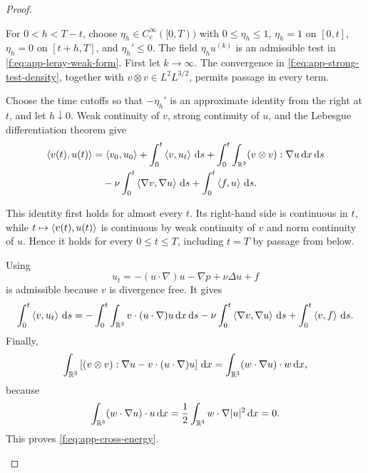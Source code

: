 \begin{proof}
\begin{samepage}
For \(0<h<T-t\), choose \(\eta_h\in C_c^\infty([0,T))\) with
\(0\le\eta_h\le1\), \(\eta_h=1\) on \([0,t]\),
\(\eta_h=0\) on \([t+h,T]\), and \(\eta_h'\le0\).  The field
\(\eta_hu^{(k)}\) is an admissible test in
\eqref{f:eq:app-leray-weak-form}.  First let \(k\to\infty\).
The convergence in \eqref{f:eq:app-strong-test-density}, together with
\(v\otimes v\in L^2L^{3/2}\), permits passage in every term.
\par
\end{samepage}
\begin{samepage}
Choose the time cutoffs so that \(-\eta_h'\) is an approximate identity from the right
at \(t\), and let \(h\downarrow0\).  Weak continuity of \(v\), strong
continuity of \(u\), and the Lebesgue differentiation theorem give
\begin{align*}
 \left\langle v(t),u(t)\right\rangle
 &=
 \left\langle v_0,u_0\right\rangle
 +\int_0^t\left\langle v,u_t\right\rangle\,\mathrm d s
 +\int_0^t\int_{\mathbb R^3}(v\otimes v):\nabla u\,\mathrm d x\,\mathrm d s\\
 &\quad-\nu\int_0^t\left\langle \nabla v,\nabla u\right\rangle\,\mathrm d s
 +\int_0^t\left\langle f,u\right\rangle\,\mathrm d s.
\end{align*}
\par
\end{samepage}
This identity first holds for almost every \(t\).  Its right-hand side is
continuous in \(t\), while \(t\mapsto\left\langle v(t),u(t)\right\rangle\) is continuous by
weak continuity of \(v\) and norm continuity of \(u\).  Hence it holds for
every \(0\le t\le T\), including \(t=T\) by passage from below.
\begin{samepage}
Using
\[
 u_t=-(u\cdot\nabla)u-\nabla p+\nu\Delta u+f
\]
is admissible because \(v\) is divergence free.  It gives
\[
 \int_0^t\left\langle v,u_t\right\rangle\,\mathrm d s
 =
 -\int_0^t\int_{\mathbb R^3}v\cdot(u\cdot\nabla)u\,\mathrm d x\,\mathrm d s
 -\nu\int_0^t\left\langle \nabla v,\nabla u\right\rangle\,\mathrm d s
 +\int_0^t\left\langle v,f\right\rangle\,\mathrm d s.
\]
Finally,
\[
 \int_{\mathbb R^3}
 \left[(v\otimes v):\nabla u-v\cdot(u\cdot\nabla)u\right]\,\mathrm d x
 =
 \int_{\mathbb R^3}(w\cdot\nabla u)\cdot w\,\mathrm d x,
\]
because
\[
 \int_{\mathbb R^3}(w\cdot\nabla u)\cdot u\,\mathrm d x
 =\frac12\int_{\mathbb R^3}w\cdot\nabla|u|^2\,\mathrm d x=0.
\]
This proves \eqref{f:eq:app-cross-energy}.
\end{samepage}
\end{proof}

